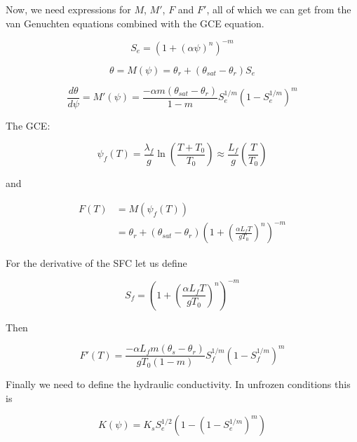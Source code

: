 \documentclass[10pt,a4paper]{article}
\begin{document}
Now, we need expressions for $M$, $M'$, $F$ and $F'$, all of which we can get from the van Genuchten equations combined with the GCE equation.

\begin{equation}
S_e=(1+(\alpha \psi)^n)^{-m}\end{equation}

\begin{equation}
\theta=M(\psi)=\theta_r+(\theta_{sat}-\theta_r)S_e\end{equation}

\begin{equation}
\frac{d\theta}{d\psi}=M'(\psi)=
\frac{-\alpha m (\theta_{sat}-\theta_r)}{1-m}
S_e^{1/m}\left(1-S_e^{1/m}\right)^m
\end{equation}

The GCE:

\begin{equation}
\psi_f(T)=\frac{\lambda_f}{g}\ln\left(\frac{T+T_0}{T_0}\right)\approx\frac{L_f}{g}\left(\frac{T}{T_0}\right)\end{equation}

and 

\begin{equation}
\begin{array}{ll}
	F(T) & =M\left(\psi_f(T)\right)
	\\
	& =
	\theta_r+(\theta_{sat}-\theta_r)\left(1+\left(
	\frac{\alpha L_fT}{gT_0}
	\right)^n\right)^{-m}
\end{array}
\end{equation}

For the derivative of the SFC let us define

\begin{equation}
S_f=\left(1+\left(\frac{\alpha L_f T}{gT_0}\right)^n
\right)^{-m}\end{equation}

Then

\begin{equation}
F'(T)=
\frac{-\alpha L_f m (\theta_s-\theta_r)}{gT_0(1-m)}
S_f^{1/m}\left(1-S_f^{1/m}\right)^m
\end{equation}

Finally we need to define the hydraulic conductivity. In unfrozen conditions this is

\begin{equation}
K(\psi)=K_sS_e^{1/2}\left(1-\left(1-S_e^{1/m}\right)^m\right)\end{equation}
\end{document}
